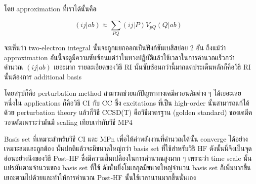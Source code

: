 โดย approximation ที่เราได้นั้นคือ

\begin{equation}
    (ij|ab) \approx \sum_{PQ} (ij|P) V_{pQ} (Q|ab)
\end{equation}

จะเห็นว่า two-electron integral นั้นจะถูกแยกออกเป็นฟังก์ชันเบสิสย่อย 2 อัน ถึงแม้ว่า approximation
อันนี้จะดูมีความซับซ้อนแต่ว่าในทางปฏิบัติแล้วใช้เวลาในการคำนวณเร็วกว่าคำนวณ $(ij|ab)$ เยอะมาก
รายละเอียดของวิธี RI นั้นซับซ้อนกว่านี้มากแต่ประเด็นหลักก็คือวิธี RI นั้นต้องการ additional basis

โดยสรุปก็คือ perturbation method สามารถช่วยแก้ปัญหาทางเคมีควอนตัมต่าง ๆ ได้เยอะเลย หนึ่งใน applications
ก็คือวิธี CI กับ CC ซึ่ง excitations ที่เป็น high-order นั้นสามารถแก้ได้ด้วย perturbation theory
แล้วก็วิธี CCSD(T) คือวิธีมาตรฐาน (golden standard) ของเคมีควอนตัมเพราะว่ามันมี scaling เทียบเท่ากับวิธี MP4

Basis set ที่เหมาะสำหรับวิธี CI และ MPn เพื่อให้ค่าพลังงานที่คำนวณได้นั้น converge ได้อย่างเหมาะสมและถูกต้อง%
นั้นปกติแล้วจะมีขนาดใหญ่กว่า basis set ที่ใช้สำหรับวิธี HF ดังนั้นนี่จึงเป็นจุดอ่อนอย่างนึงของวิธี Post-HF
ซึ่งมีความสิ้นเปลืองในการคำนวณสูงมาก ๆ เพราะว่า time scale นั้นแปรผันตามจำนวนของ basis set ที่ใช้
ดังนั้นยิ่งโมเลกุลมีขนาดใหญ่จำนวน basis set ก็เพิ่มมากขึ้นเยอะตามไปด้วยและทำให้การคำนวณ Post-HF
นั้นใช้เวลานานมากขึ้นนั่นเอง
